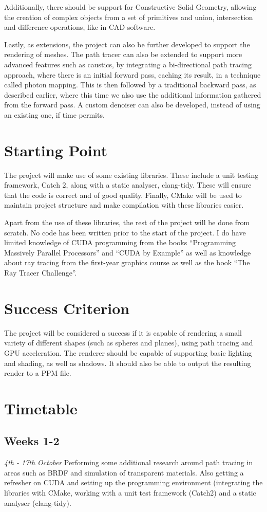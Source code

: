 \documentclass[12pt, a4paper]{article}
\newcommand{\newtime}[3]{
    \subsection*{#1}
    \vspace{-\baselineskip}
    \emph{#2}
    \vspace{\baselineskip}
    \newline
    #3
}
\begin{document}
    Additionally, there should be support for Constructive Solid Geometry, allowing the creation of complex objects from a set of primitives and union, intersection and difference operations, like in CAD software.

    Lastly, as extensions, the project can also be further developed to support the rendering of meshes. The path tracer can also be extended to support more advanced features such as caustics, by integrating a bi-directional path tracing approach, where there is an initial forward pass, caching its result, in a technique called photon mapping. This is then followed by a traditional backward pass, as described earlier, where this time we also use the additional information gathered from the forward pass. A custom denoiser can also be developed, instead of using an existing one, if time permits.

    \section*{Starting Point}
    The project will make use of some existing libraries. These include a unit testing framework, Catch 2, along with a static analyser, clang-tidy. These will ensure that the code is correct and of good quality. Finally, CMake will be used to maintain project structure and make compilation with these libraries easier.

    Apart from the use of these libraries, the rest of the project will be done from scratch. No code has been written prior to the start of the project. I do have limited knowledge of CUDA programming from the books “Programming Massively Parallel Processors” and “CUDA by Example” as well as knowledge about ray tracing from the first-year graphics course as well as the book “The Ray Tracer Challenge”.

    \section*{Success Criterion}
    The project will be considered a success if it is capable of rendering a small variety of different shapes (such as spheres and planes), using path tracing and GPU acceleration. The renderer should be capable of supporting basic lighting and shading, as well as shadows. It should also be able to output the resulting render to a PPM file.

    \section*{Timetable}
    \newtime{Weeks 1-2}{4th - 17th October}{Performing some additional research around path tracing in areas such as BRDF and simulation of transparent materials. Also getting a refresher on CUDA and setting up the programming environment (integrating the libraries with CMake, working with a unit test framework (Catch2) and a static analyser (clang-tidy).}
\end{document}
